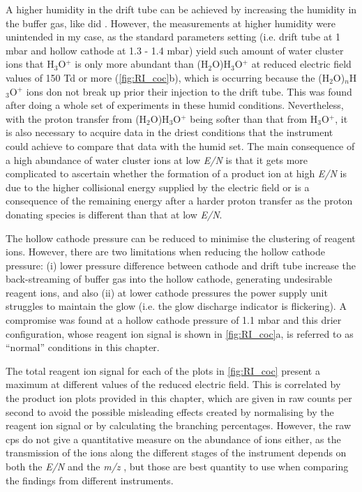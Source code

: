 A higher humidity in the drift tube can be achieved by increasing the humidity in the buffer gas, like \citeauthor{malaskova2019compendium} did \cite{malaskova2019compendium}. However, the measurements at higher humidity were unintended in my case, as the standard parameters setting (i.e. drift tube at 1 mbar and hollow cathode at 1.3 - 1.4 mbar)  yield such amount of water cluster ions that H$_3$O$^+$ is only more abundant than  (H$_2$O)H$_3$O$^+$ at reduced electric field values of 150 Td or more (\autoref{fig:RI_coc}b), which is occurring because the (H$_2$O)$_n$H$_3$O$^+$ ions don not break up prior their injection to the drift tube. This was found after doing a whole set of experiments in these humid conditions.
%
 Nevertheless, with the proton transfer from (H$_2$O)H$_3$O$^+$ being softer than that from H$_3$O$^+$, it is also necessary to acquire data in the driest conditions that the instrument could achieve to compare that data with the humid set. 
The main consequence of a high abundance of water cluster ions at low \textit{E/N} is that it gets more complicated to ascertain whether the formation of a product ion at high \textit{E/N} is due to the higher collisional energy supplied by the electric field or is a consequence of the remaining energy after a harder proton transfer as the proton donating species is different than that at low \textit{E/N}.

The hollow cathode pressure can be reduced to minimise the clustering of reagent ions.
  However, there are two limitations when reducing the hollow cathode pressure: (i) lower pressure difference between cathode and drift tube increase the back-streaming of buffer gas  into the hollow cathode, generating undesirable reagent ions, and also (ii) at lower cathode pressures the  power supply unit struggles to maintain the glow (i.e. the glow discharge indicator is flickering). 
%
A compromise was found at a hollow cathode pressure of 1.1 mbar and this drier configuration, whose reagent ion signal is shown in \autoref{fig:RI_coc}a, is referred to as ``normal'' conditions in this chapter.
%

The total reagent ion signal for each of the plots in \autoref{fig:RI_coc} present a maximum  at different values of the reduced electric field. This is correlated by the product ion plots provided in this chapter, which are given in raw counts per second to avoid the possible misleading effects created by normalising by the reagent ion signal or by calculating the branching percentages.
%
However, the raw cps do not give a quantitative measure on the abundance of ions  either, as the transmission of the ions along the different stages of the instrument depends on both the \textit{E/N} and the \textit{m/z} , but those are best quantity to use when comparing the findings from different instruments.



